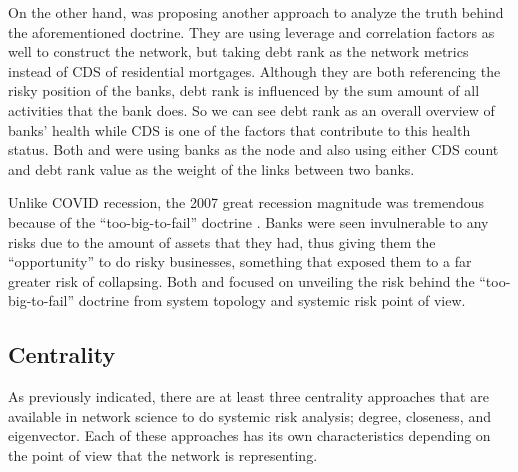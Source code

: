 \documentclass[a4paper,11pt]{article}
\begin{document}
On the other hand, \cite{Battiston_Puliga_Kaushik_Tasca_Caldarelli_2012} was proposing another approach to analyze the truth behind the aforementioned doctrine. They are using leverage and correlation factors as well to construct the network, but taking debt rank as the network metrics instead of CDS of residential mortgages. Although they are both referencing the risky position of the banks, debt rank is influenced by the sum amount of all activities that the bank does. So we can see debt rank as an overall overview of banks’ health while CDS is one of the factors that contribute to this health status. Both \cite{Markose_Giansante_Shaghaghi_2012} and \cite{Battiston_Puliga_Kaushik_Tasca_Caldarelli_2012} were using banks as the node and also using either CDS count and debt rank value as the weight of the links between two banks.

Unlike COVID recession, the 2007 great recession magnitude was tremendous because of the “too-big-to-fail” doctrine \citep{Zhou_2009}. Banks were seen invulnerable to any risks due to the amount of assets that they had, thus giving them the “opportunity” to do risky businesses, something that exposed them to a far greater risk of collapsing. Both \cite{Markose_Giansante_Shaghaghi_2012} and \cite{Battiston_Puliga_Kaushik_Tasca_Caldarelli_2012} focused on unveiling the risk behind the “too-big-to-fail” doctrine from system topology and systemic risk point of view.

\subsection{Centrality}
As previously indicated, there are at least three centrality approaches that are available in network science to do systemic risk analysis; degree, closeness, and eigenvector. Each of these approaches has its own characteristics depending on the point of view that the network is representing.
\end{document}
